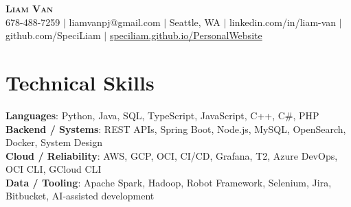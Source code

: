 \documentclass[letterpaper,11pt]{article}
\begin{document}

%
\begin{center}
    \textbf{\Huge \scshape Liam Van} \\ \vspace{1pt}
    \small 678-488-7259 $|$ \small {liamvanpj@gmail.com} $|$ Seattle, WA
 {{$|$ linkedin.com/in/liam-van} {$|$ github.com/SpeciLiam} {$|$ \href{https://speciliam.github.io/PersonalWebsite}{speciliam.github.io/PersonalWebsite}}}

\end{center}

\section{Technical Skills}
 \begin{itemize}[leftmargin=0.15in, label={}]
    \small{\item{
     \textbf{Languages}{: Python, Java, SQL, TypeScript, JavaScript, C++, C\#, PHP} \\
     \textbf{Backend / Systems}{: REST APIs, Spring Boot, Node.js, MySQL, OpenSearch, Docker, System Design} \\
     \textbf{Cloud / Reliability}{: AWS, GCP, OCI, CI/CD, Grafana, T2, Azure DevOps, OCI CLI, GCloud CLI} \\
     \textbf{Data / Tooling}{: Apache Spark, Hadoop, Robot Framework, Selenium, Jira, Bitbucket, AI-assisted development} \\
    }}
 \end{itemize}
%
\end{document}
